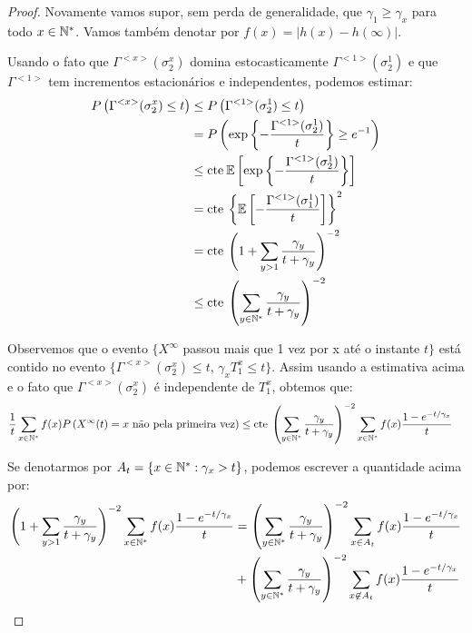 \begin{proof}
  Novamente vamos supor, sem perda de generalidade, que $\gamma_1 \geq
  \gamma_x$ para todo $x \in {\mathbb{N^*}}$. Vamos também denotar por $f(x) =
  |h(x) - h(\infty)|$.

  Usando o fato que $\Gamma^{<x>} (\sigma^x_2)$ domina
  estocasticamente $\Gamma^{<1>} (\sigma^1_2)$ e que $\Gamma^{<1>}$
  tem incrementos estacionários e independentes, podemos estimar:
  \begin{align*}
    P \left( \Gamma^{<x>} (\sigma^x_2) \leq t \right)
    &\leq P \left( \Gamma^{<1>} (\sigma^1_2) \leq t \right)\\
    &= P \left( \exp \left\{
        -\frac{\Gamma^{<1>}(\sigma^1_2)}{t}
      \right\}
        \geq e^{-1} \right)\\
    &\leq \mathrm{cte }\:
    {\mathbb{E}} \left[ \exp \left\{
        -\frac{\Gamma^{<1>}(\sigma^1_2)}{t}
      \right\} \right]\\
    &= \mathrm{cte} \: \left\{ {\mathbb{E}} \left[  -\frac{\Gamma^{<1>}(\sigma^1_1)}{t}
      \right] \right\}^2 \\
    &= \mathrm{cte} \: \left( 1 + \sum_{y > 1} \frac{\gamma_y}{t +
        \gamma_y}  \right)^{-2}\\
    &\leq \mathrm{cte} \: \left( \sum_{y \in {\mathbb{N^*}}} \frac{\gamma_y}{t +
        \gamma_y}  \right)^{-2}
  \end{align*}

  Observemos que o evento $\{ X^\infty $ passou mais que 1 vez por x
  até o instante $t\}$ está contido no evento $\{ \Gamma^{<x>}
  (\sigma^x_2) \leq t,\, \gamma_x T^x_1 \leq t\}$. Assim usando a
  estimativa acima e o fato que $\Gamma^{<x>} (\sigma^x_2)$ é
  independente de $T_1^x$, obtemos que:
  \begin{align*}
    \frac{1}{t} \sum_{x\in{\mathbb{N^*}}} f(x) P\left( X^\infty(t) = x \text{ não
        pela primeira vez}\right) 
    &\leq \mathrm{cte} \: \left( \sum_{y \in {\mathbb{N^*}}} \frac{\gamma_y}{t +
        \gamma_y}  \right)^{-2} \sum_{x \in {\mathbb{N^*}}} f(x) \frac{1 - e^{-t/\gamma_x}}{t}
  \end{align*}

  Se denotarmos por $A_t = \{ x \in {\mathbb{N^*}}: \gamma_x > t \}$,
  podemos escrever a quantidade acima por:
  \begin{align}
    \label{eq:erro-gerador-partes}
    \left( 1 + \sum_{y > 1} \frac{\gamma_y}{t + \gamma_y} \right)^{-2}
    \sum_{x \in {\mathbb{N^*}}} f(x) \frac{1 - e^{-t/\gamma_x}}{t}
    &= \left( \sum_{y \in {\mathbb{N^*}}} \frac{\gamma_y}{t + \gamma_y} \right)^{-2}
    \sum_{x \in A_t} f(x) \frac{1 - e^{-t/\gamma_x}}{t}\\
    &+ \left( \sum_{y \in {\mathbb{N^*}}} \frac{\gamma_y}{t + \gamma_y} \right)^{-2}
    \sum_{x \not\in A_t} f(x) \frac{1 - e^{-t/\gamma_x}}{t} \notag
  \end{align}


\end{proof}
